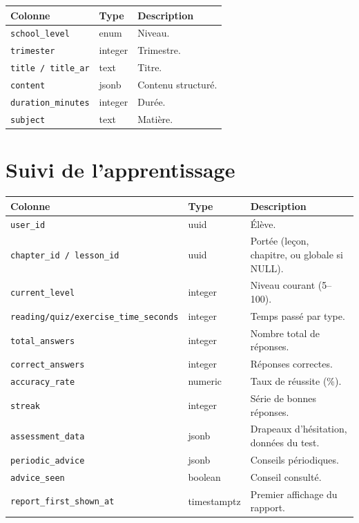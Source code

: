 \begin{longtable}{p{3.6cm}p{2.6cm}p{8cm}}
\toprule \textbf{Colonne} & \textbf{Type} & \textbf{Description} \\ \midrule \endhead
\texttt{school\_level} & enum & Niveau. \\
\texttt{trimester} & integer & Trimestre. \\
\texttt{title / title\_ar} & text & Titre. \\
\texttt{content} & jsonb & Contenu structuré. \\
\texttt{duration\_minutes} & integer & Durée. \\
\texttt{subject} & text & Matière. \\
\bottomrule
\end{longtable}

\section{Suivi de l'apprentissage}

\begin{longtable}{p{4.0cm}p{2.4cm}p{8cm}}
\toprule \textbf{Colonne} & \textbf{Type} & \textbf{Description} \\ \midrule \endhead
\texttt{user\_id} & uuid & Élève. \\
\texttt{chapter\_id / lesson\_id} & uuid & Portée (leçon, chapitre, ou globale si NULL). \\
\texttt{current\_level} & integer & Niveau courant (5--100). \\
\texttt{reading/quiz/exercise\_time\_seconds} & integer & Temps passé par type. \\
\texttt{total\_answers} & integer & Nombre total de réponses. \\
\texttt{correct\_answers} & integer & Réponses correctes. \\
\texttt{accuracy\_rate} & numeric & Taux de réussite (\%). \\
\texttt{streak} & integer & Série de bonnes réponses. \\
\texttt{assessment\_data} & jsonb & Drapeaux d'hésitation, données du test. \\
\texttt{periodic\_advice} & jsonb & Conseils périodiques. \\
\texttt{advice\_seen} & boolean & Conseil consulté. \\
\texttt{report\_first\_shown\_at} & timestamptz & Premier affichage du rapport. \\
\bottomrule
\end{longtable}

